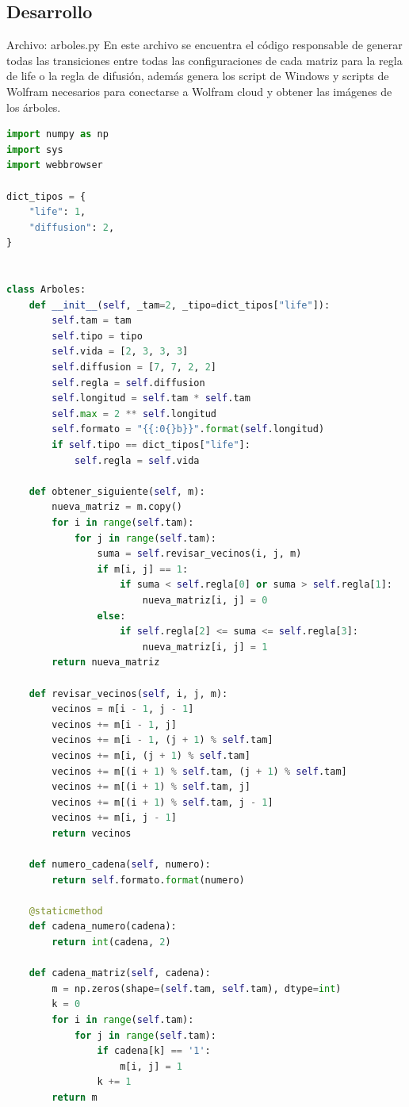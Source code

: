 \subsection{Desarrollo}
Archivo: arboles.py
En este archivo se encuentra el código responsable de generar todas las transiciones entre todas las configuraciones de cada matriz para la regla de life o la regla de difusión, además genera los script de Windows y scripts de Wolfram necesarios para conectarse a Wolfram cloud y obtener las imágenes de los árboles.
\begin{lstlisting}[language=Python]
 import numpy as np
import sys
import webbrowser

dict_tipos = {
    "life": 1,
    "diffusion": 2,
}


class Arboles:
    def __init__(self, _tam=2, _tipo=dict_tipos["life"]):
        self.tam = tam
        self.tipo = tipo
        self.vida = [2, 3, 3, 3]
        self.diffusion = [7, 7, 2, 2]
        self.regla = self.diffusion
        self.longitud = self.tam * self.tam
        self.max = 2 ** self.longitud
        self.formato = "{{:0{}b}}".format(self.longitud)
        if self.tipo == dict_tipos["life"]:
            self.regla = self.vida

    def obtener_siguiente(self, m):
        nueva_matriz = m.copy()
        for i in range(self.tam):
            for j in range(self.tam):
                suma = self.revisar_vecinos(i, j, m)
                if m[i, j] == 1:
                    if suma < self.regla[0] or suma > self.regla[1]:
                        nueva_matriz[i, j] = 0
                else:
                    if self.regla[2] <= suma <= self.regla[3]:
                        nueva_matriz[i, j] = 1
        return nueva_matriz

    def revisar_vecinos(self, i, j, m):
        vecinos = m[i - 1, j - 1]
        vecinos += m[i - 1, j]
        vecinos += m[i - 1, (j + 1) % self.tam]
        vecinos += m[i, (j + 1) % self.tam]
        vecinos += m[(i + 1) % self.tam, (j + 1) % self.tam]
        vecinos += m[(i + 1) % self.tam, j]
        vecinos += m[(i + 1) % self.tam, j - 1]
        vecinos += m[i, j - 1]
        return vecinos

    def numero_cadena(self, numero):
        return self.formato.format(numero)

    @staticmethod
    def cadena_numero(cadena):
        return int(cadena, 2)

    def cadena_matriz(self, cadena):
        m = np.zeros(shape=(self.tam, self.tam), dtype=int)
        k = 0
        for i in range(self.tam):
            for j in range(self.tam):
                if cadena[k] == '1':
                    m[i, j] = 1
                k += 1
        return m


\end{lstlisting}
